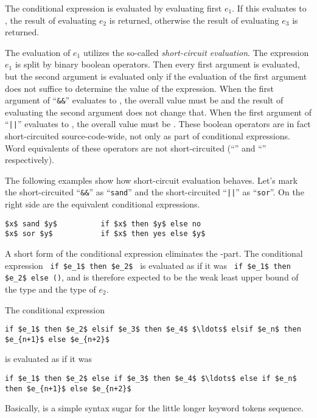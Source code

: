 The conditional expression is evaluated by evaluating first $e_1$. If this evaluates to , the result of evaluating $e_2$ is returned, otherwise the result of evaluating $e_3$ is returned. 

The evaluation of $e_1$ utilizes the so-called {\em short-circuit evaluation}. The expression $e_1$ is split by binary boolean operators. Then every first argument is evaluated, but the second argument is evaluated only if the evaluation of the first argument does not suffice to determine the value of the expression. When the first argument of ``\lstinline!&&!'' evaluates to , the overall value must be  and the result of evaluating the second argument does not change that. When the first argument of ``\lstinline!||!'' evaluates to , the overall value must be . These boolean operators are in fact short-circuited source-code-wide, not only as part of conditional expressions. Word equivalents of these operators are not short-circuited (``'' and ``'' respectively). 

\example The following examples show how short-circuit evaluation behaves. Let's mark the short-circuited ``\lstinline!&&!'' as ``\lstinline!sand!'' and the short-circuited ``\lstinline!||!'' as ``\lstinline!sor!''. On the right side are the equivalent conditional expressions. 
\begin{lstlisting}
$x$ sand $y$          if $x$ then $y$ else no
$x$ sor $y$           if $x$ then yes else $y$
\end{lstlisting}

A short form of the conditional expression eliminates the -part. The conditional expression ~\lstinline!if $e_1$ then $e_2$!~ is evaluated as if it was ~\lstinline!if $e_1$ then $e_2$ else ()!, and is therefore expected to be the weak least upper bound of the type  and the type of $e_2$. 

The conditional expression 
\begin{lstlisting}
if $e_1$ then $e_2$ elsif $e_3$ then $e_4$ $\ldots$ elsif $e_n$ then $e_{n+1}$ else $e_{n+2}$
\end{lstlisting} 
is evaluated as if it was 
\begin{lstlisting}
if $e_1$ then $e_2$ else if $e_3$ then $e_4$ $\ldots$ else if $e_n$ then $e_{n+1}$ else $e_{n+2}$
\end{lstlisting}
Basically,  is a simple syntax sugar for the little longer  keyword tokens sequence. 

